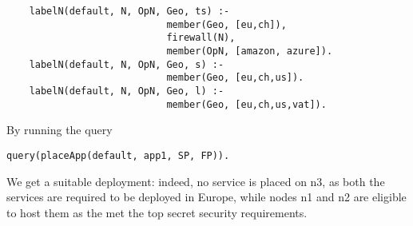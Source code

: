 \documentclass[../DraftNotes.tex]{subfiles}
\begin{document}
\begin{verbatim}
	labelN(default, N, OpN, Geo, ts) :- 
                            member(Geo, [eu,ch]), 
                            firewall(N), 
                            member(OpN, [amazon, azure]).
	labelN(default, N, OpN, Geo, s) :- 
                            member(Geo, [eu,ch,us]).
	labelN(default, N, OpN, Geo, l) :- 
                            member(Geo, [eu,ch,us,vat]).

\end{verbatim}

By running the query

\begin{verbatim}
query(placeApp(default, app1, SP, FP)).
\end{verbatim}

We get a suitable deployment: indeed, no service is placed on n3, as both the services are required to be deployed in Europe, while nodes n1 and n2 are eligible to host them as the met the top secret security requirements.
\end{document}
